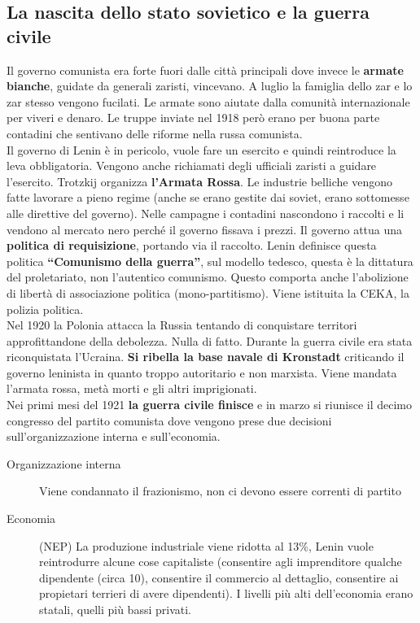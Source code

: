 \subsection{La nascita dello stato sovietico e la guerra civile}
Il governo comunista era forte fuori dalle città principali dove invece le \textbf{armate bianche},
guidate da generali zaristi, vincevano. A luglio la famiglia dello zar e lo zar stesso vengono
fucilati. Le armate sono aiutate dalla comunità internazionale per viveri e denaro. Le truppe inviate
nel 1918 però erano per buona parte contadini che sentivano delle riforme nella russa comunista.\\
Il governo di Lenin è in pericolo, vuole fare un esercito e quindi reintroduce la leva obbligatoria.
Vengono anche richiamati degli ufficiali zaristi a guidare l'esercito. Trotzkij organizza
\textbf{l'Armata Rossa}. Le industrie belliche vengono fatte lavorare a pieno regime (anche se erano
gestite dai soviet, erano sottomesse alle direttive del governo). Nelle campagne i contadini 
nascondono i raccolti e li vendono al mercato nero perché il governo fissava i prezzi. Il governo
attua una \textbf{politica di requisizione}, portando via il raccolto. Lenin definisce questa 
politica \textbf{``Comunismo della guerra''}, sul modello tedesco, questa è la dittatura del 
proletariato, non l'autentico comunismo. Questo comporta anche l'abolizione di libertà di 
associazione politica (mono-partitismo). Viene istituita la CEKA, la polizia politica.\\
[\baselineskip]
Nel 1920 la Polonia attacca la Russia tentando di conquistare territori approfittandone della 
debolezza. Nulla di fatto. Durante la guerra civile era stata riconquistata l'Ucraina. \textbf{Si
ribella la base navale di Kronstadt} criticando il governo leninista in quanto troppo autoritario e 
non marxista. Viene mandata l'armata rossa, metà morti e gli altri imprigionati.\\
Nei primi mesi del 1921 \textbf{la guerra civile finisce} e in marzo si riunisce il decimo congresso
del partito comunista dove vengono prese due decisioni sull'organizzazione interna e sull'economia.
\begin{description}
  \item[Organizzazione interna] Viene condannato il frazionismo, non ci devono essere correnti di 
    partito
  \item[Economia] (NEP) La produzione industriale viene ridotta al 13\%, Lenin vuole reintrodurre
    alcune cose capitaliste (consentire agli imprenditore qualche dipendente (circa 10), consentire
    il commercio al dettaglio, consentire ai propietari terrieri di avere dipendenti). I livelli
    più alti dell'economia erano statali, quelli più bassi privati.
\end{description} 
